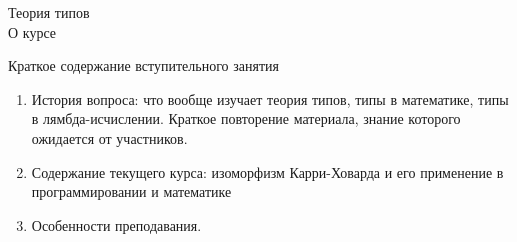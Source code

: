 \documentclass[aspectratio=169]{beamer}
\begin{document}
\newtheorem{dfn}{Определение}[section]
\newtheorem{nte}{Замечание}[section]

\newtheorem{axiom}{Аксиома}[section]
\newtheorem{thm}{Теорема}[section]
\newtheorem{lmm}[theorem]{Лемма}
\newtheorem{statement}{Утверждение}[section]
\newtheorem{oun_paragraph}{Пункт}[section]
\newtheorem{cons}{Следствие}[section]
\newtheorem*{exm}{Пример}

\newcommand{\comb}[1]{\operatorname{\mathcal{#1}}}
\newcommand{\func}[1]{\operatorname{#1}}
\newcommand{\reduction}[1]{{\color{OrangeRed}#1}}
\newcommand{\set}[1]{\left\{#1\right\}}

\def\from#1{\par \parbox{0.7\textwidth}{\par \hfill\raggedleft \it #1}} 

\begin{frame}{}
\begin{center}
{\LARGE Теория типов}\\\vspace{1cm}
О курсе
\end{center}
\end{frame}

\begin{frame}{Краткое содержание вступительного занятия}
\begin{enumerate}
\item История вопроса: что вообще изучает теория типов, типы в математике, типы в лямбда-исчислении.
Краткое повторение материала, знание которого ожидается от участников.
\item Содержание текущего курса: изоморфизм Карри-Ховарда и его применение в программировании и математике
\item Особенности преподавания.
\end{enumerate}
\end{frame}
\end{document}

